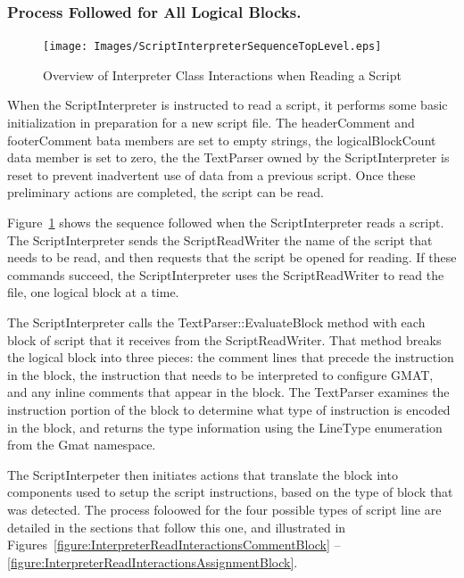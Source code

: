 \subsubsection{Process Followed for All Logical Blocks.}

\begin{figure}
\begin{center}
\texttt{[image: Images/ScriptInterpreterSequenceTopLevel.eps]}
\caption{\label{figure:InterpreterReadInteractionsTopLevel}Overview of Interpreter Class
Interactions when Reading a Script}
\end{center}
\end{figure}

When the ScriptInterpreter is instructed to read a script, it performs some basic
initialization in preparation for a new script file.  The headerComment and footerComment bata
members are set to empty strings, the logicalBlockCount data member is set to zero, the the
TextParser owned by the ScriptInterpreter is reset to prevent inadvertent use of data from a
previous script.  Once these preliminary actions are completed, the script can be read.

Figure~\ref{figure:InterpreterReadInteractionsTopLevel} shows the sequence followed when the
ScriptInterpreter reads a script.  The ScriptInterpreter sends the ScriptReadWriter the name
of the script that needs to be read, and then requests that the script be opened for reading.
If these commands succeed, the ScriptInterpreter uses the ScriptReadWriter to read the file, one
logical block at a time.

The ScriptInterpreter calls the TextParser::EvaluateBlock method with each block of script that it
receives from the ScriptReadWriter.  That method breaks the logical block into three pieces: the
comment lines that precede the instruction in the block, the instruction that needs to be
interpreted to configure GMAT, and any inline comments that appear in the block.  The TextParser
examines the instruction portion of the block to determine what type of instruction is encoded in
the block, and returns the type information using the LineType enumeration from the Gmat namespace.

The ScriptInterpeter then initiates actions that translate the block into components used to
setup the script instructions, based on the type of block that was detected.  The process foloowed
for the four possible types of script line are detailed in the sections that follow this one, and
illustrated in Figures~\ref{figure:InterpreterReadInteractionsCommentBlock} --
\ref{figure:InterpreterReadInteractionsAssignmentBlock}.

